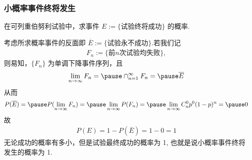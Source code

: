 \begin{frame}
	\frametitle{小概率事件终将发生}
	\begin{exam}
		在可列重伯努利试验中，求事件 $E:=\{\mbox{试验终将成功}\}$ 的概率.
	\end{exam}
	\pause

	\jieda 考虑所求概率事件的反面即 $\overline{E}:=\{\mbox{试验永不成功}\}$.\pause 若我们记
	\begin{eqnarray*}
		F_n:=\{\mbox{前} n\mbox{次试验均失败}\},
	\end{eqnarray*}
	\pause
	则易知，$\{F_n\}$ 为单调下降事件序列，且
	\begin{eqnarray*}
		\lim_{n\rightarrow \infty}F_n=\pause \cap_{n=1}^\infty F_n=\pause \overline{E}
	\end{eqnarray*}
	\pause 从而
	\begin{eqnarray*}
		P(\overline{E})=\pause P(\lim_{n\rightarrow\infty}F_n)=\pause \lim_{n\rightarrow\infty }P(F_n)=\pause \lim_{n\rightarrow\infty }C_n^0p^0(1-p)^n=\pause 0
	\end{eqnarray*}
	\pause 故
	\begin{eqnarray*}
		P(E)=1-P(\overline{E})=1-0=1
	\end{eqnarray*}
	\pause 无论成功的概率有多小，但是试验最终成功的概率为 1, 也就是说小概率事件终将发生的概率为 1.
\end{frame}






